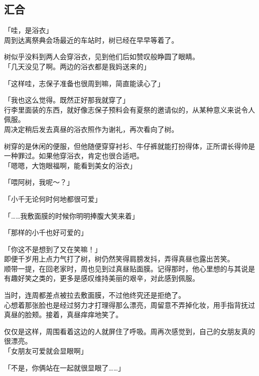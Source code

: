 \subsection{汇合}

「哇，是浴衣」\\

周到达离祭典会场最近的车站时，树已经在早早等着了。

树似乎没料到两人会穿浴衣，见到他们后如赞叹般睁圆了眼睛。\\

「几天没见了啊。两边的浴衣都是我妈送来的」

「这样哇，志保子准备也很周到嘛，简直能读心了」

「我也这么觉得。既然正好那我就穿了」\\

行李里面装的东西，就好像志保子预料会有夏祭的邀请似的，从某种意义来说令人佩服。\\

周决定稍后发去真昼的浴衣照作为谢礼，再次看向了树。

树穿的是休闲的便服，但他随便穿穿衬衫、牛仔裤就能打扮得体，正所谓长得帅是一种罪过。如果他穿浴衣，肯定也很合适吧。\\

「嗯嗯，大饱眼福啊，能看到美女的浴衣」

「喂阿树，我呢～？」

「小千无论何时何地都很可爱」

「……我敷面膜的时候你明明捧腹大笑来着」

「那样的小千也好可爱的」

「你这不是想到了又在笑嘛！」\\

即便千岁用上点力气打了树，树仍然笑得肩膀发抖，弄得真昼也露出苦笑。\\

顺带一提，在回老家时，周也见到过真昼贴面膜。记得那时，他心里想的与其说是有趣好笑之类的，更多是感叹维持美丽的艰辛，对此感到佩服。

当时，连周都差点被拉去敷面膜，不过他终究还是拒绝了。\\

心想着那张脸也是经过努力才打理得那么漂亮，周留意不弄掉化妆，用手指背抚过真昼的脸颊。接着，真昼痒痒地笑了。

仅仅是这样，周围看着这边的人就屏住了呼吸。周再次感觉到，自己的女朋友真的很漂亮。\\

「女朋友可爱就会显眼啊」

「不是，你俩站在一起就很显眼了……」

